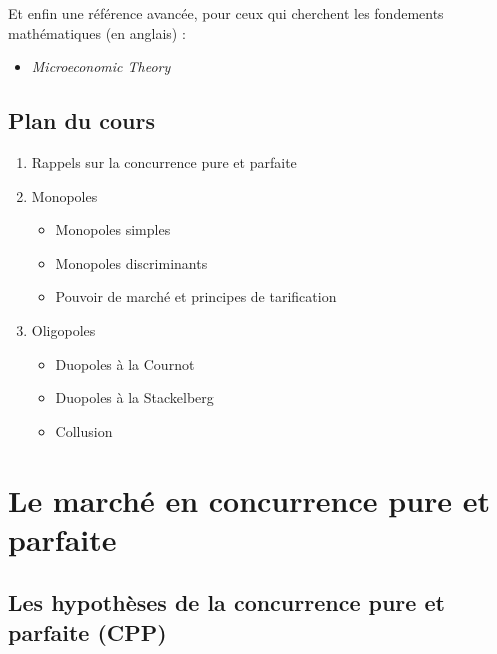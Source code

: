 \documentclass[
]{book}
\providecommand{\tightlist}{%
  \setlength{\itemsep}{0pt}\setlength{\parskip}{0pt}}
\theoremstyle{definition}
\theoremstyle{definition}
\theoremstyle{definition}
\theoremstyle{definition}
\theoremstyle{remark}
\begin{document}
Et enfin une référence avancée, pour ceux qui cherchent les fondements mathématiques (en anglais) :

\begin{itemize}
\tightlist
\item
  \citet{mas1995} \emph{Microeconomic Theory}
\end{itemize}

\hypertarget{plan-du-cours}{%
\section{Plan du cours}\label{plan-du-cours}}

\begin{enumerate}
\def\labelenumi{\arabic{enumi}.}
\tightlist
\item
  Rappels sur la concurrence pure et parfaite
\item
  Monopoles

  \begin{itemize}
  \tightlist
  \item
    Monopoles simples
  \item
    Monopoles discriminants
  \item
    Pouvoir de marché et principes de tarification
  \end{itemize}
\item
  Oligopoles

  \begin{itemize}
  \tightlist
  \item
    Duopoles à la Cournot
  \item
    Duopoles à la Stackelberg
  \item
    Collusion
  \end{itemize}
\end{enumerate}

\hypertarget{le-marchuxe9-en-concurrence-pure-et-parfaite}{%
\chapter{Le marché en concurrence pure et parfaite}\label{le-marchuxe9-en-concurrence-pure-et-parfaite}}


\hypertarget{les-hypothuxe8ses-de-la-concurrence-pure-et-parfaite-cpp}{%
\section{Les hypothèses de la concurrence pure et parfaite (CPP)}\label{les-hypothuxe8ses-de-la-concurrence-pure-et-parfaite-cpp}}
\end{document}
